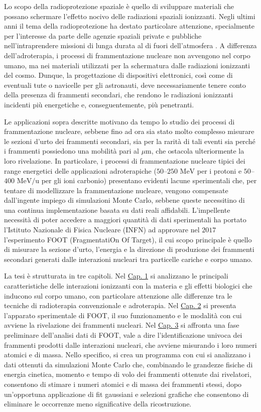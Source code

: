 \documentclass[12pt,a4paper,twoside]{report}
\begin{document}
	Lo scopo della radioprotezione spaziale è quello di sviluppare materiali che possano schermare l'effetto nocivo delle radiazioni spaziali ionizzanti. Negli ultimi anni il tema della radioprotezione ha destato particolare attenzione, specialmente per l'interesse da parte delle agenzie spaziali private e pubbliche nell'intraprendere missioni di lunga durata al di fuori dell'atmosfera \cite{ubaldiArticle}. A differenza dell'adroterapia, i processi di frammentazione nucleare non avvengono nel corpo umano, ma nei materiali utilizzati per la schermatura dalle radiazioni ionizzanti del cosmo. Dunque, la progettazione di dispositivi elettronici, così come di eventuali tute o navicelle per gli astronauti, deve necessariamente tenere conto della presenza di frammenti secondari, che rendono le radiazioni ionizzanti incidenti più energetiche e, conseguentemente, più penetranti.
	
	Le applicazioni sopra descritte motivano da tempo lo studio dei processi di frammentazione nucleare, sebbene fino ad ora sia stato molto complesso misurare le sezioni d'urto dei frammenti secondari, sia per la rarità di tali eventi sia perché i frammenti possiedono una mobilità pari al $\mu\mbox{m}$, che ostacola ulteriormente la loro rivelazione. In particolare, i processi di frammentazione nucleare tipici dei range energetici delle applicazioni adroterapiche ($50$--$250\mbox{ MeV}$ per i protoni e $50$--$400\mbox{ MeV/u}$ per gli ioni carbonio) presentano evidenti lacune sperimentali che, per tentare di modellizzare la frammentazione nucleare, vengono compensate dall'ingente impiego di simulazioni Monte Carlo, sebbene queste necessitino di una continua implementazione basata su dati reali affidabili. L'impellente necessità di poter accedere a maggiori quantità di dati sperimentali ha portato l'Istituto Nazionale di Fisica Nucleare (INFN) ad approvare nel $2017$ l'esperimento FOOT (FragmentatiOn Of Target), il cui scopo principale è quello di misurare la sezione d'urto, l'energia e la direzione di produzione dei frammenti secondari generati dalle interazioni nucleari tra particelle cariche e corpo umano.
	
	La tesi è strutturata in tre capitoli. Nel \hyperref[cap:1]{Cap. 1} si analizzano le principali caratteristiche delle interazioni ionizzanti con la materia e gli effetti biologici che inducono sul corpo umano, con particolare attenzione alle differenze tra le tecniche di radioterapia convenzionale e adroterapia. Nel \hyperref[cap:2]{Cap. 2} si presenta l'apparato sperimentale di FOOT, il suo funzionamento e le modalità con cui avviene la rivelazione dei frammenti nucleari. Nel \hyperref[cap:3]{Cap. 3} si affronta una fase preliminare dell'analisi dati di FOOT, vale a dire l'identificazione univoca dei frammenti prodotti dalle interazioni nucleari, che avviene misurando i loro numeri atomici e di massa. Nello specifico, si crea un programma con cui si analizzano i dati ottenuti da simulazioni Monte Carlo che, combinando le grandezze fisiche di energia cinetica, momento e tempo di volo dei frammenti ottenute dai rivelatori, consentono di stimare i numeri atomici e di massa dei frammenti stessi, dopo un'opportuna applicazione di fit gaussiani e selezioni grafiche che consentono di eliminare le occorrenze meno significative della ricostruzione.
	\newpage
\end{document}
